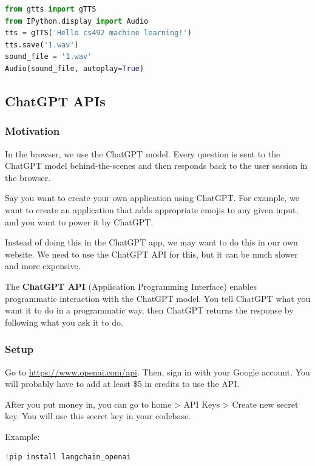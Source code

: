{\begin{lstlisting}[language=Python, breaklines=true]
from gtts import gTTS
from IPython.display import Audio
tts = gTTS('Hello cs492 machine learning!')
tts.save('1.wav')
sound_file = '1.wav'
Audio(sound_file, autoplay=True)
\end{lstlisting}
\vspace{11pt}

\subsection{ChatGPT APIs}
\vspace{11pt}

\subsubsection{Motivation}
\vspace{11pt}

In the browser, we use the ChatGPT model. Every question is sent to the ChatGPT model behind-the-scenes and then responds back to the user session in the browser.

Say you want to create your own application using ChatGPT. For example, we want to create an application that adds appropriate emojis to any given input, and you want to power it by ChatGPT.

Instead of doing this in the ChatGPT app, we may want to do this in our own website. We need to use the ChatGPT API for this, but it can be much slower and more expensive.

The \textbf{ChatGPT API} (Application Programming Interface) enables programmatic interaction with the ChatGPT model. You tell ChatGPT what you want it to do in a programmatic way, then ChatGPT returns the response by following what you ask it to do.

\vspace{11pt}
\subsubsection{Setup}
\vspace{11pt}

Go to \href{https://www.openai.com/api}{https://www.openai.com/api}. Then, sign in with your Google account. You will probably have to add at least \$5 in credits to use the API.

After you put money in, you can go to home > API Keys > Create new secret key. You will use this secret key in your codebase.

Example:

\vspace{11pt}
\begin{lstlisting}[language=Python, breaklines=true]
!pip install langchain_openai


\end{lstlisting}}
